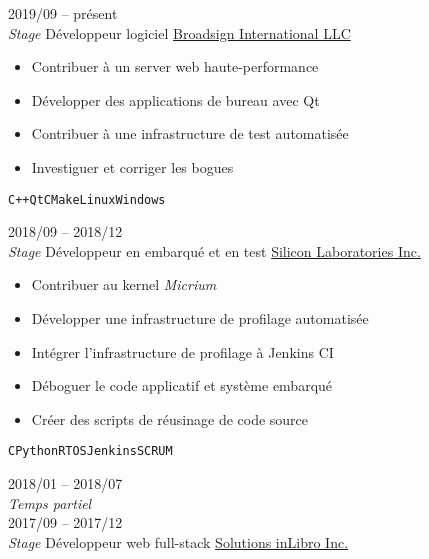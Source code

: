 \documentclass[9pt]{developercv} %
\begin{document}
\begin{minipage}[t]{0.8\textwidth}

\begin{entrylist}
	\entry
		{2019/09 -- présent\\{\small\emph{Stage}}}
		{Développeur logiciel}
		{\href{https://broadsign.com/}{Broadsign International LLC}}
		{
			\vspace{-14pt}
			\begin{itemize}
				\renewcommand{\labelitemi}{\raisebox{.45ex}{\rule{.6ex}{.6ex}}}
				\setlength\itemsep{-1pt}
				\item Contribuer à un server web haute-performance
				\item Développer des applications de bureau avec Qt
				\item Contribuer à une infrastructure de test automatisée
				\item Investiguer et corriger les bogues
			\end{itemize}
			\vspace{-4pt}
			\texttt{C++}\slashsep\texttt{Qt}\slashsep\texttt{CMake}\slashsep\texttt{Linux}\slashsep\texttt{Windows}
		}
	\entry
		{2018/09 -- 2018/12\\{\small\emph{Stage}}}
		{Développeur en embarqué et en test}
		{\href{https://www.silabs.com/}{Silicon Laboratories Inc.}}
		{
			\vspace{-14pt}
			\begin{itemize}
				\renewcommand{\labelitemi}{\raisebox{.45ex}{\rule{.6ex}{.6ex}}}
				\setlength\itemsep{-1pt}
				\item Contribuer au kernel \emph{Micrium}
				\item Développer une infrastructure de profilage automatisée
				\item Intégrer l'infrastructure de profilage à Jenkins CI
				\item Déboguer le code applicatif et système embarqué
				\item Créer des scripts de réusinage de code source
			\end{itemize}
			\vspace{-4pt}
			\texttt{C}\slashsep\texttt{Python}\slashsep\texttt{RTOS}\slashsep\texttt{Jenkins}\slashsep\texttt{SCRUM}
		}
	\entry
		{2018/01 -- 2018/07\\{\small\emph{Temps partiel}}\\2017/09 -- 2017/12\\{\small\emph{Stage}}}
		{Développeur web full-stack}
		{\href{https://inlibro.com/}{Solutions inLibro Inc.}}

\end{entrylist}
\end{minipage}
\end{document}
